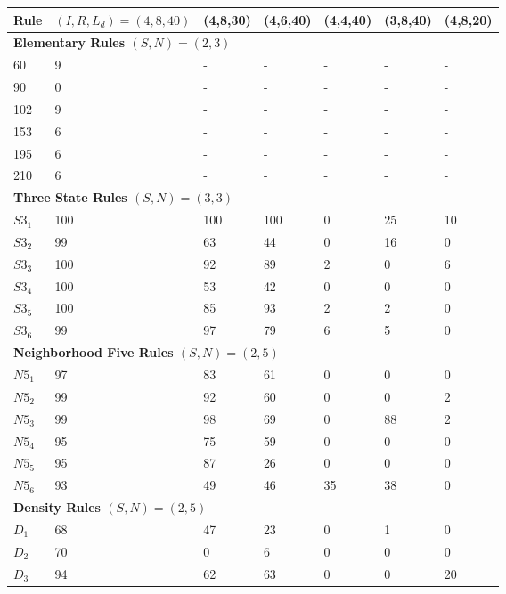 \documentclass{elsarticle}
\begin{document}
\begin{multicols}{2}
\begin{table}[!htbp] \centering
\small
\begin{tabular}{|l|l|l|l|l|l|l|}
\hline
\textbf{Rule} & \textbf{\boldmath$(I,R,L_{d})=(4,8,40)$} & \textbf{(4,8,30)} & 
\textbf{(4,6,40)} & \textbf{(4,4,40)} & \textbf{(3,8,40)} & \textbf{(4,8,20)} 
\\ \hline
\multicolumn{7}{|l|}{\textbf{Elementary Rules \boldmath$(S,N) = (2,3)$}} \\ 
\hline
60 & 9 & - & - & - & - & - \\ \hline
90 & 0 & - & - & - & - & - \\ \hline
102 & 9 & - & - & - & - & - \\ \hline
153 & 6 & - & - & - & - & - \\ \hline
195 & 6 & - & - & - & - & - \\ \hline
210 & 6 & - & - & - & - & - \\ \hline
\multicolumn{7}{|l|}{\textbf{Three State Rules \boldmath$(S,N) = (3,3)$}} \\ 
\hline
$S3_{1}$ & 100 & 100 & 100 & 0 & 25 & 10 \\ \hline
$S3_{2}$ & 99 & 63 & 44 & 0 & 16 & 0 \\ \hline
$S3_{3}$ & 100 & 92 & 89 & 2 & 0 & 6 \\ \hline
$S3_{4}$ & 100 & 53 & 42 & 0 & 0 & 0 \\ \hline
$S3_{5}$ & 100 & 85 & 93 & 2 & 2 & 0 \\ \hline
$S3_{6}$ & 99 & 97 & 79 & 6 & 5 & 0 \\ \hline
\multicolumn{7}{|l|}{\textbf{Neighborhood Five Rules \boldmath$(S,N) = (2,5)$}} 
\\ \hline
$N5_{1}$ & 97 & 83 & 61 & 0 & 0 & 0 \\ \hline
$N5_{2}$ & 99 & 92 & 60 & 0 & 0 & 2 \\ \hline
$N5_{3}$ & 99 & 98 & 69 & 0 & 88 & 2  \\ \hline
$N5_{4}$ & 95 & 75 & 59 & 0 & 0 & 0 \\ \hline
$N5_{5}$ & 95 & 87 & 26 & 0 & 0 & 0 \\ \hline
$N5_{6}$ & 93 & 49 & 46 & 35 & 38 & 0  \\ \hline
\multicolumn{7}{|l|}{\textbf{Density Rules \boldmath$(S,N) = (2,5)$}} \\ \hline
$D_{1}$ & 68 & 47 & 23 & 0 & 1 & 0  \\ \hline
$D_{2}$ & 70 & 0 & 6 & 0 & 0 & 0 \\ \hline
$D_{3}$ & 94 & 62 & 63 & 0 & 0 & 20 \\ \hline

\end{tabular}
\end{table}
\end{multicols}
\end{document}
